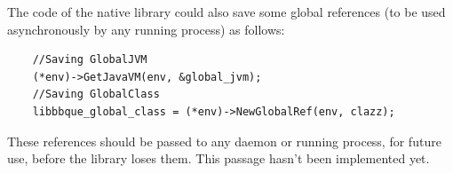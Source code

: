 The code of the native library could also save some global references (to be used asynchronously by any running process) as follows:
\begin{verbatim}
	//Saving GlobalJVM
	(*env)->GetJavaVM(env, &global_jvm);
	//Saving GlobalClass
	libbbque_global_class = (*env)->NewGlobalRef(env, clazz);
\end{verbatim}
These references should be passed to any daemon or running process, for future use, before the library loses them. This passage hasn't been implemented yet.